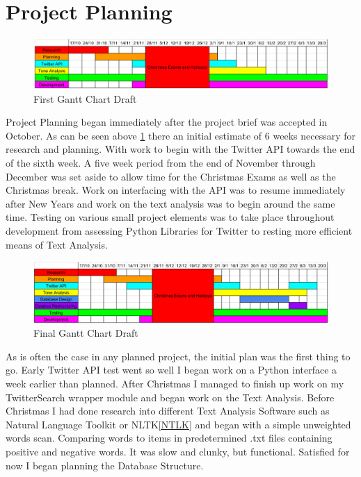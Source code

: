 \documentclass[12pt,a4paper]{report}
\begin{document}
  \section{Project Planning}
  \begin{figure}[h]
  \includegraphics[width=\textwidth]{tt1}
  \caption{First Gantt Chart Draft}
  \label{fig:tt1}
  \end{figure}
  Project Planning began immediately after the project brief was accepted in October. As can be seen above \ref{fig:tt1} there an initial estimate of 6 weeks necessary for research and planning. With work to begin with the Twitter API towards the end of the sixth week. A five week period from the end of November through December was set aside to allow time for the Christmas Exams as well as the Christmas break. Work on interfacing with the API was to resume immediately after New Years and work on the text analysis was to begin around the same time. Testing on various small project elements was to take place throughout development from assessing Python Libraries for Twitter to resting more efficient means of Text Analysis.
  \par
  \begin{figure}[h]
  \includegraphics[width=\textwidth]{tt2}
  \caption{Final Gantt Chart Draft}
  \label{fig:tt2}
  \end{figure}
  As is often the case in any planned project, the initial plan was the first thing to go. Early Twitter API test went so well I began work on a Python interface a week earlier than planned. After Christmas I managed to finish up work on my TwitterSearch\cite{TwitterSearch} wrapper module and began work on the Text Analysis. Before Christmas I had done research into different Text Analysis Software such as Natural Language Toolkit or NLTK\ref{NTLK} and began with a simple unweighted words scan. Comparing words to items in predetermined .txt files containing positive and negative words. It was slow and clunky, but functional. Satisfied for now I began planning the Database Structure.
  \clearpage
\end{document}
